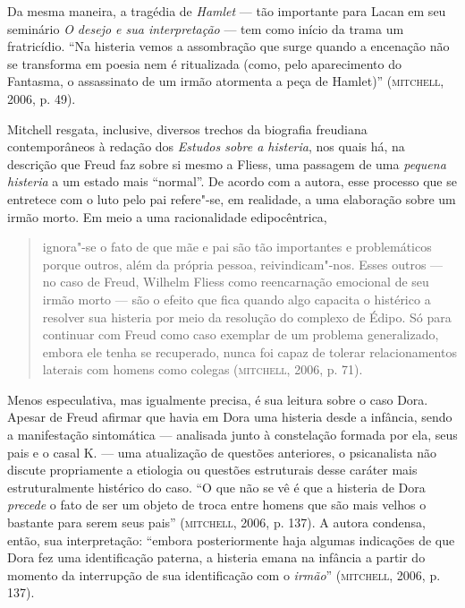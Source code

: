 Da mesma maneira, a tragédia de \emph{Hamlet} --- tão importante para
Lacan em seu seminário \emph{O desejo e sua interpretação} --- tem como
início da trama um fratricídio. ``Na histeria vemos a assombração que
surge quando a encenação não se transforma em poesia nem é ritualizada
(como, pelo aparecimento do Fantasma, o assassinato de um irmão
atormenta a peça de Hamlet)'' (\textsc{mitchell}, 2006, p. 49).

Mitchell resgata, inclusive, diversos trechos da biografia freudiana
contemporâneos à redação dos \emph{Estudos sobre a histeria}, nos quais
há, na descrição que Freud faz sobre si mesmo a Fliess, uma passagem de
uma \emph{pequena histeria} a um estado mais ``normal''. De acordo com a
autora, esse processo que se entretece com o luto pelo pai refere"-se, em
realidade, a uma elaboração sobre um irmão morto. Em meio a uma
racionalidade edipocêntrica,

\begin{quote}
ignora"-se o fato de que mãe e pai são tão importantes e problemáticos
porque outros, além da própria pessoa, reivindicam"-nos. Esses outros ---
no caso de Freud, Wilhelm Fliess como reencarnação emocional de seu
irmão morto --- são o efeito que fica quando algo capacita o histérico a
resolver sua histeria por meio da resolução do complexo de Édipo. Só
para continuar com Freud como caso exemplar de um problema generalizado,
embora ele tenha se recuperado, nunca foi capaz de tolerar
relacionamentos laterais com homens como colegas (\textsc{mitchell}, 2006, p. 71).
\end{quote}

Menos especulativa, mas igualmente precisa, é sua leitura sobre o caso
Dora. Apesar de Freud afirmar que havia em Dora uma histeria desde a
infância, sendo a manifestação sintomática --- analisada junto à
constelação formada por ela, seus pais e o casal K. --- uma atualização
de questões anteriores, o psicanalista não discute propriamente a
etiologia ou questões estruturais desse caráter mais estruturalmente
histérico do caso. ``O que não se vê é que a histeria de Dora
\emph{precede} o fato de ser um objeto de troca entre homens que são
mais velhos o bastante para serem seus pais'' (\textsc{mitchell}, 2006, p.
137). A autora condensa, então, sua interpretação: ``embora
posteriormente haja algumas indicações de que Dora fez uma identificação
paterna, a histeria emana na infância a partir do momento da interrupção
de sua identificação com o \emph{irmão}'' (\textsc{mitchell}, 2006, p. 137).

